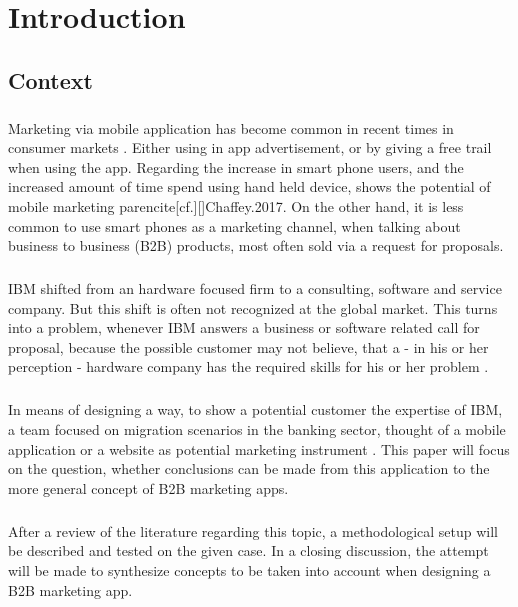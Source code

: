 \chapter{Introduction}
\section{Context}
\paragraph*{}
Marketing via mobile application has become common in recent times in consumer markets \parencite[cf.][]{Chaffey.2017}. Either using in app advertisement, or by giving a free trail when using the app. Regarding the increase in smart phone users, and the increased amount of time spend using hand held device, shows the potential of mobile marketing parencite[cf.][]{Chaffey.2017}. On the other hand, it is less common to use smart phones as a marketing channel, when talking about business to business (B2B) products, most often sold via a request for proposals.
\paragraph*{}
IBM shifted from an hardware focused firm to a consulting, software and service company. But this shift is often not recognized at the global market. This turns into a problem, whenever IBM answers a business or software related call for proposal, because the possible customer may not believe, that a - in his or her perception - hardware company has the required skills for his or her problem \parencite[cf.][]{Sachs.20.04.2017}.
\paragraph*{}
In means of designing a way, to show a potential customer the expertise of IBM, a team focused on migration scenarios in the banking sector, thought of a mobile application or a website as potential marketing instrument \parencite[cf.][]{Sachs.20.04.2017}. This paper will focus on the question, whether conclusions can be made from this application to the more general concept of B2B marketing apps. 
\paragraph{} After a review of the literature regarding this topic, a methodological setup will be described and tested on the given case. In a closing discussion, the attempt will be made to synthesize concepts to be taken into account when designing a B2B marketing app.